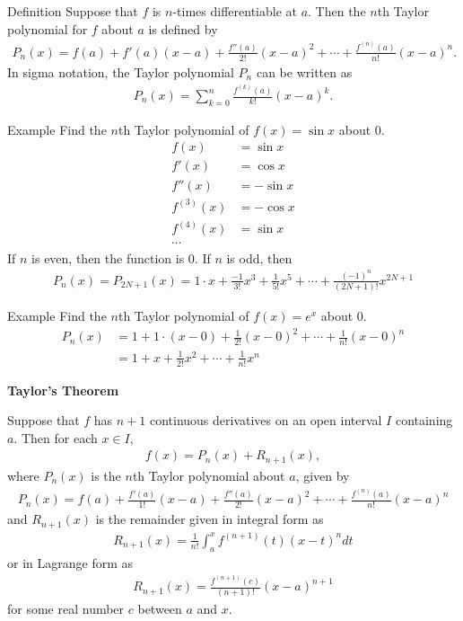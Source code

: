\documentclass{report}
\begin{document}
	\begin{question}{Definition}
		Suppose that $f$ is $n$-times differentiable at $a$. Then the $n$th Taylor polynomial for $f$ about $a$ is defined by
		\begin{align*}
			P_n(x) = f(a) + f'(a)(x - a) + \frac{f''(a)}{2!}(x - a)^2 + \cdots + \frac{f^{(n)}(a)}{n!} (x - a)^n.
		\end{align*}
		In sigma notation, the Taylor polynomial $P_n$ can be written as
		\begin{align*}
			P_n(x) = \sum_{k=0}^n \frac{f^{(k)}(a)}{k!} (x - a)^k.
		\end{align*}
	\end{question}

	\begin{question}{Example}
		Find the $n$th Taylor polynomial of $f(x) = \sin x$ about $0$.
		\begin{align*}
			f(x) &= \sin x	\\
			f'(x) &= \cos x	\\
			f''(x) &= -\sin x	\\
			f^{(3)}(x) &= -\cos x	\\
			f^{(4)}(x) &= \sin x	\\
			\cdots
		\end{align*}
		If $n$ is even, then the function is $0$. If $n$ is odd, then
		\begin{align*}
			P_n(x) = P_{2N + 1}(x) = 1 \cdot x + \frac{-1}{3!} x^3 + \frac{1}{5!} x^5 + \cdots + \frac{(-1)^n}{(2N + 1)!} x^{2N + 1}
		\end{align*}
	\end{question}

	\begin{question}{Example}
		Find the $n$th Taylor polynomial of $f(x) = e^x$ about $0$.
		\begin{align*}
			P_n(x) &= 1 + 1 \cdot (x - 0) + \frac{1}{2!} (x - 0)^2 + \cdots + \frac{1}{n!}(x-0)^n	\\
				   &= 1 + x + \frac{1}{2!}x^2 + \cdots + \frac{1}{n!}x^n
		\end{align*}
	\end{question}

	\textbf{Taylor's Theorem}
		
		Suppose that $f$ has $n + 1$ continuous derivatives on an open interval $I$ containing $a$. Then for each $x \in I$,
		\begin{align*}
			f(x) = P_n(x) + R_{n + 1}(x),
		\end{align*}
		where $P_n(x)$ is the $n$th Taylor polynomial about $a$, given by
		\begin{align*}
			P_n(x) = f(a) + \frac{f'(a)}{1!}(x-a) + \frac{f''(a)}{2!}(x-a)^2 + \cdots + \frac{f^{(n)}(a)}{n!}(x-a)^n
		\end{align*}
		and $R_{n + 1}(x)$ is the remainder given in integral form as
		\begin{align*}
			R_{n + 1}(x) = \frac{1}{n!} \int_a^x f^{(n+1)}(t)(x - t)^n dt
		\end{align*}
		or in Lagrange form as
		\begin{align*}
			R_{n + 1}(x) = \frac{f^{(n+1)}(c)}{(n+1)!}(x-a)^{n+1}
		\end{align*}
		for some real number $c$ between $a$ and $x$.
\end{document}
